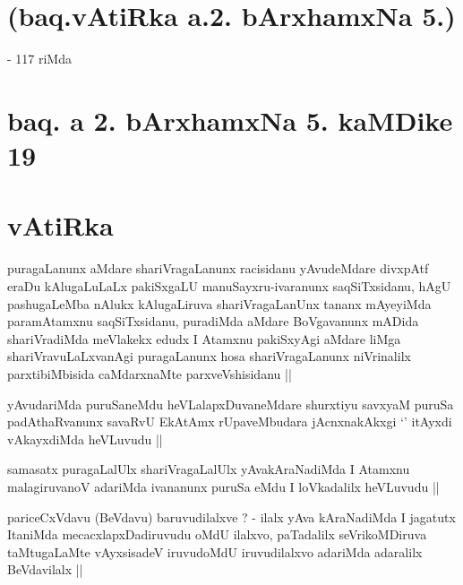 
\section*{(baq.vAtiRka a.2. bArxhamxNa 5.)}

\begin{center}
- 117 riMda
\end{center}

\section*{baq. a 2. bArxhamxNa 5. kaMDike 19}

\stext


\section*{vAtiRka}

\begin{artha}
puragaLanunx aMdare shariVragaLanunx racisidanu yAvudeMdare divxpAtf
eraDu kAlugaLuLaLx pakiSxgaLU manuSayxru-ivaranunx saqSiTxsidanu, hAgU
pashugaLeMba nAlukx kAlugaLiruva shariVragaLanUnx tananx mAyeyiMda
paramAtamxnu saqSiTxsidanu, puradiMda aMdare BoVgavanunx mADida
shariVradiMda meVlakekx edudx I Atamxnu pakiSxyAgi aMdare liMga
shariVravuLaLxvanAgi puragaLanunx hosa shariVragaLanunx niVrinalilx
parxtibiMbisida caMdarxnaMte parxveVshisidanu ||
\end{artha}

\begin{artha}
yAvudariMda puruSaneMdu heVLalapxDuvaneMdare shurxtiyu savxyaM puruSa
padAthaRvanunx savaRvU EkAtAmx rUpaveMbudara jAcnxnakAkxgi `\stext'
itAyxdi vAkayxdiMda heVLuvudu ||
\end{artha}

\begin{artha}
samasatx puragaLalUlx shariVragaLalUlx yAvakAraNadiMda I Atamxnu
malagiruvanoV adariMda ivananunx puruSa eMdu I loVkadalilx heVLuvudu ||
\end{artha}


\begin{artha}
pariceCxVdavu (BeVdavu) baruvudilalxve ? - ilalx yAva kAraNadiMda I
jagatutx ItaniMda mecacxlapxDadiruvudu oMdU ilalxvo, paTadalilx
seVrikoMDiruva taMtugaLaMte vAyxsisadeV iruvudoMdU iruvudilalxvo
adariMda adaralilx BeVdavilalx || 
\end{artha}

